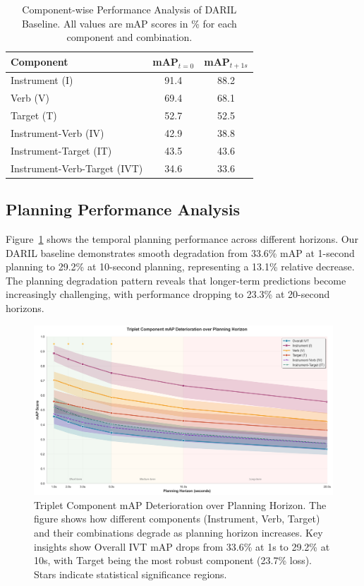 \documentclass[runningheads]{llncs}
\begin{document}
\begin{table}[h]
\centering
\caption{Component-wise Performance Analysis of DARIL Baseline. All values are mAP scores in \% for each component and combination.}
\label{tab:component_analysis}
\begin{tabular}{lcc}
\toprule
\textbf{Component} & \textbf{mAP$_{t=0}$} & \textbf{mAP$_{t+1s}$} \\
\midrule
Instrument (I) & 91.4 & 88.2 \\
Verb (V) & 69.4 & 68.1 \\
Target (T) & 52.7 & 52.5 \\
\midrule
Instrument-Verb (IV) & 42.9 & 38.8 \\
Instrument-Target (IT) & 43.5 & 43.6 \\
Instrument-Verb-Target (IVT) & 34.6 & 33.6 \\
\bottomrule
\end{tabular}
\end{table}

\subsection{Planning Performance Analysis}

Figure~\ref{fig:planning_analysis} shows the temporal planning performance across different horizons. Our DARIL baseline demonstrates smooth degradation from 33.6\% mAP at 1-second planning to 29.2\% at 10-second planning, representing a 13.1\% relative decrease. The planning degradation pattern reveals that longer-term predictions become increasingly challenging, with performance dropping to 23.3\% at 20-second horizons.

\begin{figure}[h]
\centering
\includegraphics[width=\textwidth]{planning_analysis_simple.png}
\caption{Triplet Component mAP Deterioration over Planning Horizon. The figure shows how different components (Instrument, Verb, Target) and their combinations degrade as planning horizon increases. Key insights show Overall IVT mAP drops from 33.6\% at 1s to 29.2\% at 10s, with Target being the most robust component (23.7\% loss). Stars indicate statistical significance regions.}
\label{fig:planning_analysis}
\end{figure}
\end{document}
